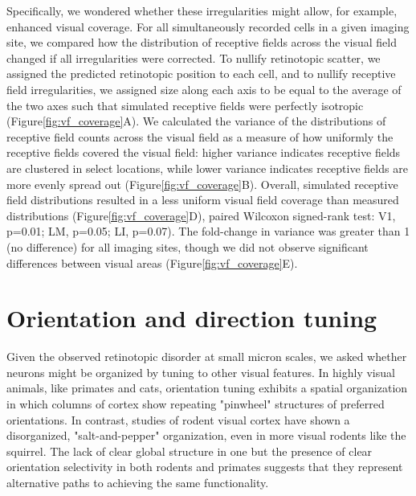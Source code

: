 Specifically, we wondered whether these irregularities might allow, for example, enhanced visual coverage. For all simultaneously recorded cells in a given imaging site, we compared how the distribution of receptive fields across the visual field changed if all irregularities were corrected. To nullify retinotopic scatter, we assigned the predicted retinotopic position to each cell, and to nullify receptive field irregularities, we assigned size along each axis to be equal to the average of the two axes such that simulated receptive fields were perfectly isotropic (Figure\ref{fig:vf_coverage}A). We calculated the variance of the distributions of receptive field counts across the visual field as a measure of how uniformly the receptive fields covered the visual field:  higher variance indicates receptive fields are clustered in select locations, while lower variance indicates receptive fields are more evenly spread out (Figure\ref{fig:vf_coverage}B). Overall, simulated receptive field distributions resulted in a less uniform visual field coverage than measured distributions (Figure\ref{fig:vf_coverage}D), paired Wilcoxon signed-rank test: V1, p=0.01; LM, p=0.05; LI, p=0.07). The fold-change in variance was greater than 1 (no difference) for all imaging sites, though we did not observe significant differences between visual areas (Figure\ref{fig:vf_coverage}E). 



\section{Orientation and direction tuning}
Given the observed retinotopic disorder at small micron scales, we asked whether neurons might be organized by tuning to other visual features. In highly visual animals, like primates and cats, orientation tuning exhibits a spatial organization in which columns of cortex show repeating "pinwheel" structures of preferred orientations\cite{REFREF}. In contrast, studies of rodent visual cortex have shown a disorganized, "salt-and-pepper" organization\cite{Ohki2005, REFREF}, even in more visual rodents like the squirrel\cite{VanHooser2005FunctionalRodent, REFREF}. The lack of clear global structure in one but the presence of clear orientation selectivity in both rodents and primates suggests that they represent alternative paths to achieving the same functionality.

